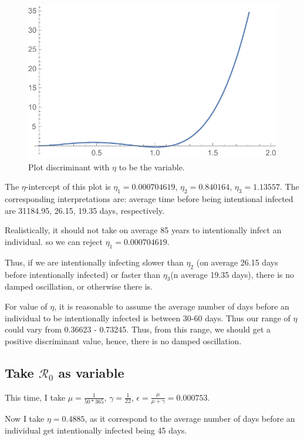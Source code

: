 \documentclass[12pt]{article}
\begin{document}
\begin{figure}[h!]
  \caption{Plot discriminant with $\eta$ to be the variable.}
  \centering
  \includegraphics[width=1\textwidth]{Figures/Discriminant_plot_S.pdf}
\end{figure}

The $\eta$-intercept of this plot is $\eta_1=0.000704619$, $\eta_2=0.840164$, $\eta_3=1.13557$. The corresponding interpretations are: average time before being intentional infected are 31184.95, 26.15, 19.35 days, respectively.

Realistically, it should not take on average 85 years to intentionally infect an individual. so we can reject $\eta_1=0.000704619$.

Thus, if we are intentionally infecting slower than $\eta_2$ (on average 26.15 days before intentionally infected) or faster than $\eta_3$(n average 19.35 days), there is no damped oscillation, or otherwise there is.

For value of $\eta$, it is reasonable to assume the average number of days before an individual to be intentionally infected is between 30-60 days. Thus our range of $\eta$ could vary from 0.36623 - 0.73245. Thus, from this range, we should get a positive discriminant value, hence, there is no damped oscillation.

\subsection{Take $\mathcal{R}_0$ as variable}

This time, I take $\mu=\frac{1}{50*365}$, $\gamma=\frac{1}{22}$, $\epsilon=\frac{\mu}{\mu+\gamma}=0.000753$. 

Now I take $\eta=0.4885$, as it correspond to the average number of days before an individual get intentionally infected being 45 days.
\end{document}
